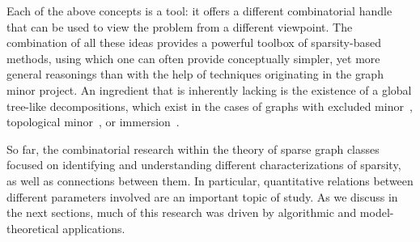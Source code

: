 Each of the above concepts is a tool: it offers a different combinatorial handle that can be used to view the problem from a different viewpoint.
The combination of all these ideas provides a powerful toolbox of sparsity-based methods, using which one can often provide conceptually simpler, yet more general reasonings than 
with the help of techniques originating in the graph minor project. 
An ingredient that is inherently lacking is the existence of a global tree-like decompositions,
which exist in the cases of graphs with excluded minor~\cite{GM16}, topological minor~\cite{GroheM15}, or immersion~\cite{Wollan15}.

So far, the combinatorial research within the theory of sparse graph classes focused on identifying and understanding different characterizations of sparsity, as well as connections between them.
In particular, quantitative relations between different parameters involved are an important topic of study.
As we discuss in the next sections, much of this research was driven by algorithmic and model-theoretical applications.



